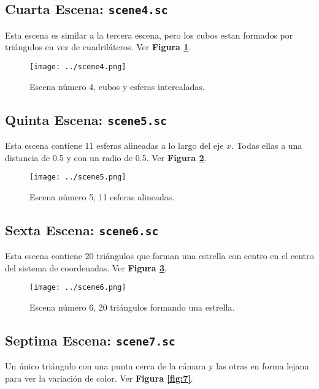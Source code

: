 \documentclass[a4paper,10pt]{article}
\begin{document}
\subsection{Cuarta Escena: \texttt{scene4.sc}}
Esta escena es similar a la tercera escena, pero los cubos estan formados por tri\'angulos en vez de cuadril\'ateros.  Ver \textbf{Figura \ref{fig:4}}.

\begin{figure}[h]
 \centering
 \texttt{[image: ../scene4.png]}
 \caption{Escena n\'umero 4, cubos y esferas intercaladas.}
 \label{fig:4}
\end{figure}

\subsection{Quinta Escena: \texttt{scene5.sc}}
Esta escena contiene 11 esferas alineadas a lo largo del eje $x$.  Todas ellas a una distancia de 0.5 y con un radio de 0.5. Ver \textbf{Figura \ref{fig:5}}.

\begin{figure}[h]
 \centering
 \texttt{[image: ../scene5.png]}
 \caption{Escena n\'umero 5, 11 esferas alineadas.}
 \label{fig:5}
\end{figure}

\subsection{Sexta Escena: \texttt{scene6.sc}}
Esta escena contiene 20 tri\'angulos que forman una estrella con centro en el centro del sistema de coordenadas.  Ver \textbf{Figura \ref{fig:6}}.

\begin{figure}[h]
 \centering
 \texttt{[image: ../scene6.png]}
 \caption{Escena n\'umero 6, 20 tri\'angulos formando una estrella.}
 \label{fig:6}
\end{figure}

\subsection{Septima Escena: \texttt{scene7.sc}}
Un \'unico tri\'angulo con una punta cerca de la c\'amara y las otras en forma lejana para ver la variaci\'on de color.  Ver \textbf{Figura \ref{fig:7}}.
\end{document}
